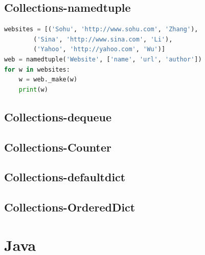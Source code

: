 \documentclass[12pt, a4paper]{report}
\begin{document}
        \subsection{Collections-namedtuple}
        \begin{lstlisting}[language=Python]
websites = [('Sohu', 'http://www.sohu.com', 'Zhang'), 
		('Sina', 'http://www.sina.com', 'Li'), 
		('Yahoo', 'http://yahoo.com', 'Wu')]
web = namedtuple('Website', ['name', 'url', 'author'])
for w in websites:
	w = web._make(w)
	print(w)
        \end{lstlisting}
        
        \subsection{Collections-dequeue}
        
        \subsection{Collections-Counter}
        
        \subsection{Collections-defaultdict}
        
        \subsection{Collections-OrderedDict}
        

    
\section{Java}
\end{document}
